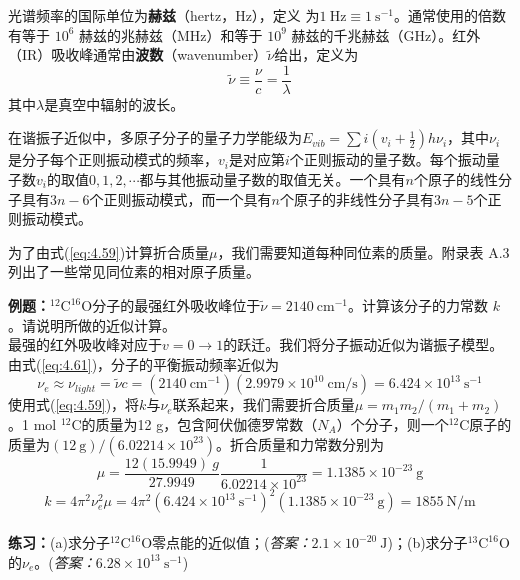    光谱频率的国际单位为\textbf{赫兹}（hertz，Hz），定义
    为$1 \:\mathrm{Hz} \equiv 1 \:\mathrm{s}^{-1}$。通常使用的倍数有等于 $10^6$ 赫兹的兆赫兹（MHz）和等于 $10^9$ 赫兹的千兆赫兹（GHz）。红外（IR）吸收峰通常由\textbf{波数}（wavenumber）$\tilde{\nu}$给出，定义为
    \begin{equation}
        \boxed{
            \tilde{\nu} \equiv \frac{\nu}{c} = \frac{1}{\lambda}
        }
        \label{eq:4.64}
    \end{equation}
    其中$\lambda$是真空中辐射的波长。

    在谐振子近似中，多原子分子的量子力学能级为$E_{vib} = \sum i\left(v_i+\frac{1}{2}\right)h\nu_i$，其中$\nu_i$是分子每个正则振动模式的频率，$v_i$是对应第$i$个正则振动的量子数。每个振动量子数$v_i$的取值$0,1,2,\cdots$都与其他振动量子数的取值无关。一个具有$n$个原子的线性分子具有$3n-6$个正则振动模式，而一个具有$n$个原子的非线性分子具有$3n-5$个正则振动模式。

    为了由式(\ref{eq:4.59})计算折合质量$\mu$，我们需要知道每种同位素的质量。附录表 A.3 列出了一些常见同位素的相对原子质量。

    \begin{examplebox}
        \textbf{例题：}$^{12}\mathrm{C}^{16}\mathrm{O}$分子的最强红外吸收峰位于$\tilde{\nu} = 2140 \:\mathrm{cm}^{-1}$。计算该分子的力常数 $k$。请说明所做的近似计算。\\
        
        最强的红外吸收峰对应于$v = 0 \to 1$的跃迁。我们将分子振动近似为谐振子模型。由式(\ref{eq:4.61})，分子的平衡振动频率近似为
        \begin{equation*}
            \nu_e \approx \nu_{light} = \tilde{\nu}c = \left(2140 \:\mathrm{cm}^{-1}\right)\left(2.9979 \times 10^{10} \:\mathrm{cm/s}\right)  = 6.424 \times 10^{13} \:\mathrm{s}^{-1}
        \end{equation*}
        使用式(\ref{eq:4.59})，将$k$与$\nu_e$联系起来，我们需要折合质量$\mu = m_1m_2/\left(m_1+m_2\right)$。1 mol $^{12}\mathrm{C}$的质量为12 g，包含阿伏伽德罗常数（$N_A$）个分子，则一个$^{12}\mathrm{C}$原子的质量为$\left(12 \: \mathrm{g} \right)/ \left(6.02214 \times 10^{23}\right)$。折合质量和力常数分别为
        \begin{equation*}
            \mu = \frac{12 \left(15.9949\right)\: g}{27.9949} \frac{1}{6.02214 \times 10^{23}} = 1.1385 \times 10^{-23} \:\mathrm{g}
        \end{equation*}
        \begin{equation*}
            k = 4\pi^2 \nu_e^2\mu = 4\pi^2 \left(6.424 \times 10^{13} \:\mathrm{s}^{-1}\right)^2\left(1.1385 \times 10^{-23} \:\mathrm{g}\right) = 1855 \: \mathrm{N} / \mathrm{m}
        \end{equation*}
        \\
        
        \textbf{练习：}(a)求分子$^{12}\mathrm{C}^{16}\mathrm{O}$零点能的近似值；(\textit{答案：}$2.1 \times 10^{-20} \:\mathrm{J}$)；(b)求分子$^{13}\mathrm{C}^{16}\mathrm{O}$的$\nu_e$。(\textit{答案：}$6.28 \times 10^{13} \:\mathrm{s}^{-1}$)
    \end{examplebox}

